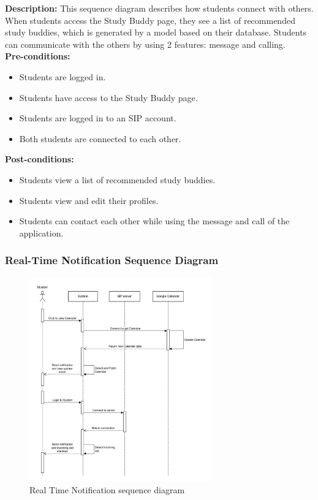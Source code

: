     \textbf{Description:} This sequence diagram describes how students connect with others. 
    When students access the Study Buddy page, they see a list of recommended study buddies, which is generated by a model based on their database. 
    Students can communicate with the others by using 2 features: message and calling. \\

    \noindent \textbf{Pre-conditions:} 
        \begin{itemize}
            \item Students are logged in.
            \item Students have access to the Study Buddy page.
            \item Students are logged in to an SIP account.
            \item Both students are connected to each other.
        \end{itemize}
    \noindent \textbf{Post-conditions:}
    \begin{itemize}
        \item Students view a list of recommended study buddies.
        \item Students view and edit their profiles.
        \item Students can contact each other while using the message and call of the application.
    \end{itemize}

\subsubsection{Real-Time Notification Sequence Diagram}
    \begin{figure}[H]
        \centering
        \includegraphics[width=0.7\textwidth]{image/Real-timeNotification.pdf} 
        \caption{Real Time Notification sequence diagram}
        \label{fig:noti_sequence}
    \end{figure}

